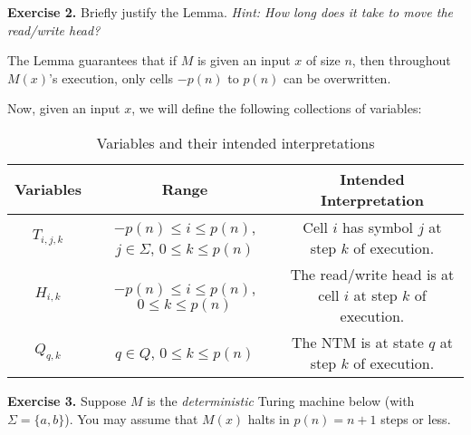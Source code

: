 \documentclass[10pt]{article}
\begin{document}
\noindent \textbf{Exercise 2.} Briefly justify the Lemma. \textit{Hint: How long does it take to move the read/write head?}
\vspace{2mm}

The Lemma guarantees that if $M$ is given an input $x$ of size $n$, then throughout $M(x)$'s execution, only cells $-p(n)$ to $p(n)$ can be overwritten.


Now, given an input $x$, we will define the following collections of variables:

\begin{table}[ht]
	\centering
	\begin{tabular}{c|c|c}
		Variables & Range & Intended Interpretation\\
		\hline 
		$T_{i, j, k}$ & $-p(n) \leq i \leq p(n)$, $j \in \Sigma$, $0 \leq k \leq p(n)$ & Cell $i$ has symbol $j$ at step $k$ of execution.\\
		\hline
		$H_{i, k}$ & $-p(n) \leq i \leq p(n)$, $0 \leq k \leq p(n)$ & The read/write head is at cell $i$ at step $k$ of execution.\\
		\hline
		$Q_{q, k}$ & $q \in Q$, $0 \leq k \leq p(n)$ & The NTM is at state $q$ at step $k$ of execution.
	\end{tabular}
	\caption{Variables and their intended interpretations}
	\label{table:1}
\end{table}

\noindent \textbf{Exercise 3.} Suppose $M$ is the \textit{deterministic} Turing machine below (with $\Sigma = \{a, b\}$). You may assume that $M(x)$ halts in $p(n) = n + 1$ steps or less.
\end{document}
